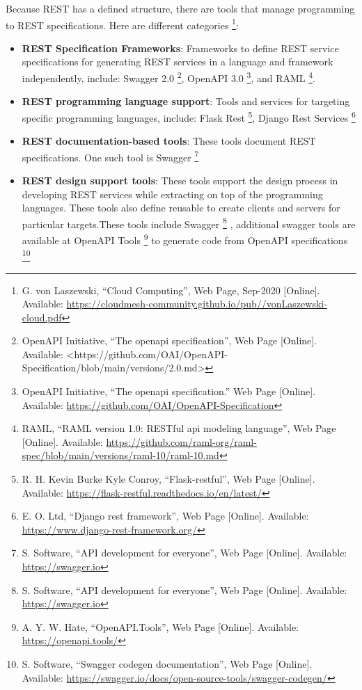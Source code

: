 Because REST has a defined structure, there are tools that manage
programming to REST specifications. Here are different categories
\footnote{G. von Laszewski, ``Cloud Computing'', Web Page, Sep-2020
  {[}Online{]}. Available:
  \url{https://cloudmesh-community.github.io/pub//vonLaszewski-cloud.pdf}}:

\begin{itemize}
\tightlist
\item
  \textbf{REST Specification Frameworks}: Frameworks to define REST
  service specifications for generating REST services in a language and
  framework independently, include: Swagger 2.0 \footnote{OpenAPI
    Initiative, ``The openapi specification'', Web Page {[}Online{]}.
    Available: \textless https://github.com/OAI/OpenAPI-
    Specification/blob/main/versions/2.0.md\textgreater{}}, OpenAPI 3.0
  \footnote{OpenAPI Initiative, ``The openapi specification.'' Web Page
    {[}Online{]}. Available:
    \url{https://github.com/OAI/OpenAPI-Specification}}, and RAML
  \footnote{RAML, ``RAML version 1.0: RESTful api modeling language'',
    Web Page {[}Online{]}. Available:
    \url{https://github.com/raml-org/raml-spec/blob/main/versions/raml-10/raml-10.md}}.
\item
  \textbf{REST programming language support}: Tools and services for
  targeting specific programming languages, include: Flask Rest
  \footnote{R. H. Kevin Burke Kyle Conroy, ``Flask-restful'', Web Page
    {[}Online{]}. Available:
    \url{https://flask-restful.readthedocs.io/en/latest/}}, Django Rest
  Services \footnote{E. O. Ltd, ``Django rest framework'', Web Page
    {[}Online{]}. Available:
    \url{https://www.django-rest-framework.org/}}
\item
  \textbf{REST documentation-based tools}: These tools document REST
  specifications. One such tool is Swagger \footnote{S. Software, ``API
    development for everyone'', Web Page {[}Online{]}. Available:
    \url{https://swagger.io}}
\item
  \textbf{REST design support tools}: These tools support the design
  process in developing REST services while extracting on top of the
  programming languages. These tools also define reusable to create
  clients and servers for particular targets.These tools include Swagger
  \footnote{S. Software, ``API development for everyone'', Web Page
    {[}Online{]}. Available: \url{https://swagger.io}} , additional
  swagger tools are available at OpenAPI Tools \footnote{A. Y. W. Hate,
    ``OpenAPI.Tools'', Web Page {[}Online{]}. Available:
    \url{https://openapi.tools/}} to generate code from OpenAPI
  specifications \footnote{S. Software, ``Swagger codegen
    documentation'', Web Page {[}Online{]}. Available:
    \url{https://swagger.io/docs/open-source-tools/swagger-codegen/}}
\end{itemize}

